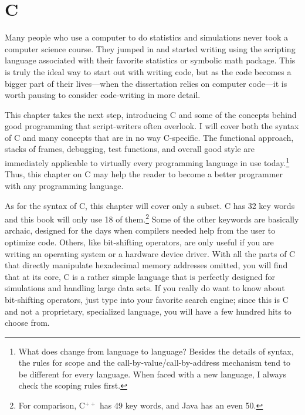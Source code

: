 	\chapter{C} \label{c_crash} 

Many people who use a computer to do statistics and simulations never
took a computer science course. They jumped in and started writing
using the scripting language associated with their favorite statistics or
symbolic math package. This is truly the ideal way to start out with writing
code, but as the code becomes a bigger part of their lives---when the
dissertation relies on computer code---it is worth pausing to consider
code-writing in more detail. 

This chapter takes the next step, introducing C and some of the
concepts behind good programming that script-writers often overlook.
I will cover both the syntax of C and many concepts that are in no way
C-specific. The functional approach, stacks of frames, debugging,
test functions, and overall good style are immediately applicable to
virtually every programming language in use today.\footnote{What does
change from language to language?  Besides the details of syntax, the
rules for scope and the call-by-value/call-by-address mechanism tend
to be different for every language. When faced with a new language, I
always check the scoping rules first.} Thus, this chapter on C may help
the reader to become a better programmer with any programming language.

As for the syntax of C, this chapter will cover only a subset. C has
32 key words and this book will only use 18 of them.\footnote{For
comparison, C$^{++}$ has 49 key words, and  Java has an even 50.} Some of the other keywords are basically
archaic, designed for the days when compilers needed help from the user to
optimize code. Others, like bit-shifting operators, are only useful
if you are writing an operating system or a hardware device driver. With
all the parts of C that directly manipulate hexadecimal memory addresses
omitted, you will find that at its core, C is a rather simple language
that is perfectly designed for simulations and handling large data sets.
If you really do want to know about bit-shifting operators, just type
 into your favorite search engine; since this is C and
not a proprietary, specialized language, you will have a few hundred
hits to choose from.

